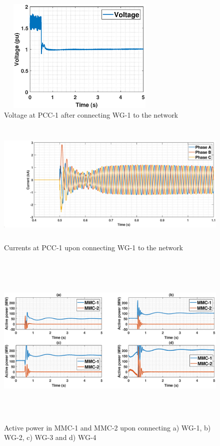 \begin{figure}[H]
\centering
    \includegraphics[height = 5.5cm,width = 8cm]{Diagrams/Chapter_5/VACP_WT1_WT1connect.eps}
    \caption{Voltage at PCC-1 after connecting WG-1 to the network}
    \label{VACP_WT1_WT1connect}
\end{figure}

\begin{figure}[H]
\centering
    \includegraphics[height = 6cm,width = 16.5cm]{Diagrams/Chapter_5/IABC_WT1_WT1connect.eps}
    \caption{Currents at PCC-1 upon connecting WG-1 to the network}
    \label{IABC_WT1_WT1connect}
\end{figure}

\begin{figure}[H]
\hspace*{-1.2cm}
    \includegraphics[height = 8.5cm,width = 18.5cm]{Diagrams/Chapter_5/P_MMC_1_2_WT1234connect.eps}
    \caption{Active power in \gls{MMC}-1 and \gls{MMC}-2 upon connecting a) WG-1, b) WG-2, c) WG-3 and d) WG-4}
    \label{P_MMC_1_2_WT1234connect}
\end{figure}

